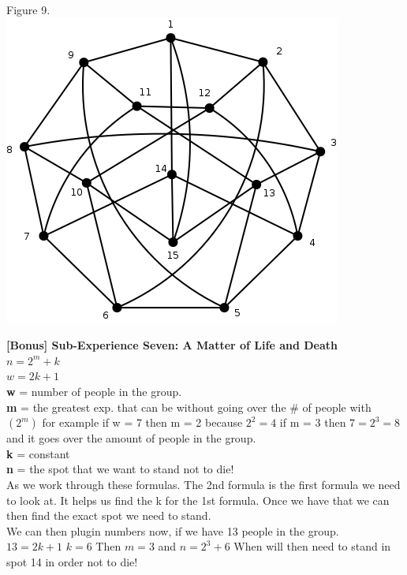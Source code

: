 \documentclass[10pt,a4paper]{report}
\begin{document}
	\begin{center}
		Figure 9.\\
		\includegraphics[scale=.5]{e6.png}
		\newline
		\newline
	\end{center}
	\textbf{[Bonus] Sub-Experience Seven: A Matter of Life and Death}\\	
	$n = 2^m + k$\\
	$w = 2k + 1$\\
	\textbf{w} = number of people in the group.\\
	\textbf{m} = the greatest exp. that can be without going over the \# of people with $(2^m)$ for example if w = 7 then m = 2 because $2^2 = 4$ if m = 3 then $7 = 2^3 = 8$ and it goes over the amount of people in the group.\\
	\textbf{k} = constant\\
	\textbf{n} = the spot that we want to stand not to die!\\
	\newline
	As we work through these formulas.  The 2nd formula is the first formula we need to look at.  It helps us find the k for the 1st formula.  Once we have that we can then find the exact spot we need to stand.\\
	\newline
	We can then plugin numbers now, if we have 13 people in the group.\\
	$13 = 2k + 1$ $k = 6$  Then $m = 3$ and $n = 2^3 + 6$ When will then need to stand in spot 14 in order not to die!
	\begin{center}
		
	\end{center}
\end{document}
